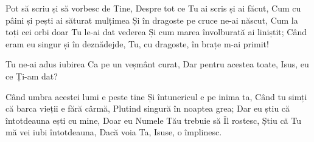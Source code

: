 \beginverse
Pot să scriu și să vorbesc de Tine,
Despre tot ce Tu ai scris și ai făcut,
Cum cu pâini și pești ai săturat mulțimea
Și în dragoste pe cruce ne-ai născut,
Cum la toți cei orbi doar Tu le-ai dat vederea
Și cum marea învolburată ai liniștit;
Când eram eu singur și în deznădejde,
Tu, cu dragoste, în brațe m-ai primit!
\endverse

\beginchorus
Tu ne-ai adus iubirea
Ca pe un veșmânt curat,
Dar pentru acestea toate,
Isus, eu ce Ți-am dat?
\endchorus

\beginverse
Când umbra acestei lumi e peste tine
Și întunericul e pe inima ta,
Când tu simți că barca vieții e fără cârmă,
Plutind singură în noaptea grea;
Dar eu știu că întotdeauna ești cu mine,
Doar eu Numele Tău trebuie să Îl rostesc,
Știu că Tu mă vei iubi întotdeauna,
Dacă voia Ta, Isuse, o împlinesc.
\endverse
\endsong